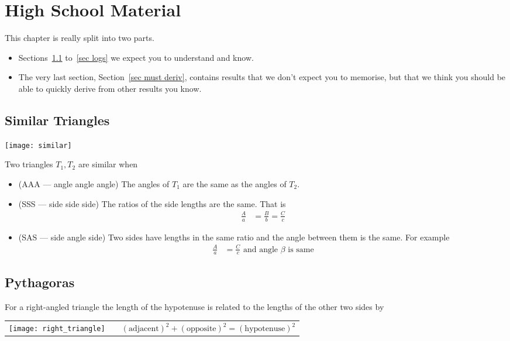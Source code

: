 %
%
\graphicspath{{figures/highschool/}}
\chapter{High School Material}\label{app highschool}
This chapter is really split into two parts.
\begin{itemize}
 \item Sections~\ref{sec simtri} to~\ref{sec logs} we expect you to understand and
know.
\item The very last section, Section~\ref{sec must deriv}, contains results that we don't
expect you to memorise, but that we think you should be able to quickly derive from other
results you know.
\end{itemize}

\section{Similar Triangles}\label{sec simtri}
\begin{center}
 \texttt{[image: similar]}
\end{center}
Two triangles $T_1,T_2$ are similar when
\begin{itemize}
 \item (AAA --- angle angle angle) The angles of $T_1$ are the same as the
angles of $T_2$.
 \item (SSS --- side side side) The ratios of the side lengths are the same.
That is
\begin{align*}
  \frac{A}{a} &= \frac{B}{b} = \frac{C}{c}
\end{align*}
 \item (SAS --- side angle side) Two sides have lengths in the same ratio and
the angle between them is the same. For example
\begin{align*}
  \frac{A}{a} &= \frac{C}{c} \text{ and angle $\beta$ is same}
\end{align*}
\end{itemize}


\section{Pythagoras}\label{sec_A_2}
For a right-angled triangle the length of the hypotenuse is related to the lengths of the other two sides by
\begin{center}
\begin{tabular}{m{4cm}cm{9cm}}
  \texttt{[image: right\_triangle]} &\qquad &
$(\text{adjacent})^2+(\text{opposite})^2 = (\text{hypotenuse})^2$
\end{tabular}
\end{center}
